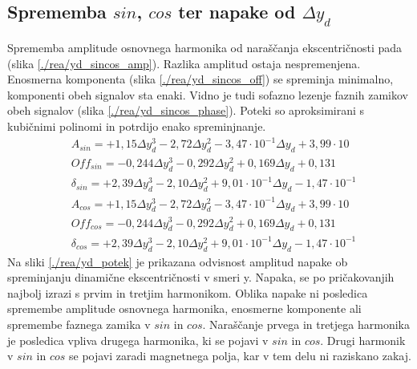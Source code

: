 \subsection{Sprememba $sin$, $cos$ ter napake od $\Delta y_d$}
Sprememba amplitude osnovnega harmonika od naraščanja ekscentričnosti pada (slika \ref{./rea/yd_sincos_amp}). Razlika amplitud ostaja nespremenjena. Enosmerna komponenta (slika \ref{./rea/yd_sincos_off}) se spreminja minimalno, komponenti obeh signalov sta enaki. Vidno je tudi sofazno lezenje faznih zamikov obeh signalov (slika \ref{./rea/yd_sincos_phase}). Poteki so aproksimirani s kubičnimi polinomi in potrdijo enako spreminjnanje.
\begin{eqnarray}
&A_{sin} = +1,15\Delta y_d^3-2,72\Delta y_d^2-3,47\cdot 10^{-1}\Delta y_d+3,99\cdot 10\\     
&Off_{sin} = -0,244\Delta y_d^3-0,292\Delta y_d^2+0,169\Delta y_d+0,131\\   
&\delta_{sin} = +2,39\Delta y_d^3-2,10\Delta y_d^2+9,01\cdot 10^{-1}\Delta y_d-1,47\cdot 10^{-1}\\
&A_{cos} = +1,15\Delta y_d^3-2,72\Delta y_d^2-3,47\cdot 10^{-1}\Delta y_d+3,99\cdot 10\\     
&Off_{cos} = -0,244\Delta y_d^3-0,292\Delta y_d^2+0,169\Delta y_d+0,131\\   
&\delta_{cos} = +2,39\Delta y_d^3-2,10\Delta y_d^2+9,01\cdot 10^{-1}\Delta y_d-1,47\cdot 10^{-1} 
\end{eqnarray}
Na sliki \ref{./rea/yd_potek} je prikazana odvisnost amplitud napake ob spreminjanju dinamične ekscentričnosti v smeri y. Napaka, se po pričakovanjih najbolj izrazi s prvim in tretjim harmonikom. Oblika napake ni posledica spremembe amplitude osnovnega harmonika, enosmerne komponente ali spremembe faznega zamika v $sin$ in $cos$. Naraščanje prvega in tretjega harmonika je posledica vpliva drugega harmonika, ki se pojavi v $sin$ in $cos$. Drugi harmonik v $sin$ in $cos$ se pojavi zaradi magnetnega polja, kar v tem delu ni raziskano zakaj.
